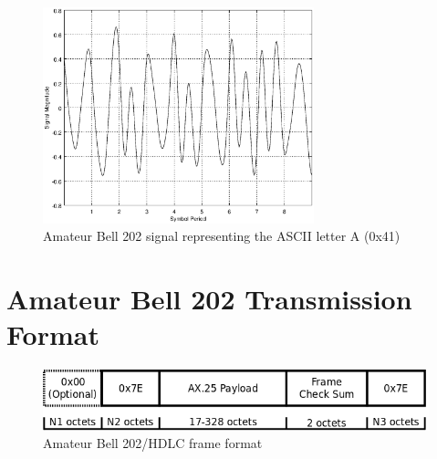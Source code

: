 \begin{figure}
	\centering
	\includegraphics[width=0.7\textwidth]{src/octave/bell202A}
	\caption{Amateur Bell 202 signal representing the ASCII letter A (0x41)}
	\label{fig:bell202sample}
\end{figure}


\section{Amateur Bell 202 Transmission Format}

\begin{figure}
	\centering
	\includegraphics[width=1.0\textwidth]{src/dia/bell202}
	\caption{Amateur Bell 202/HDLC frame format}
	\label{fig:bell202format}
\end{figure}

